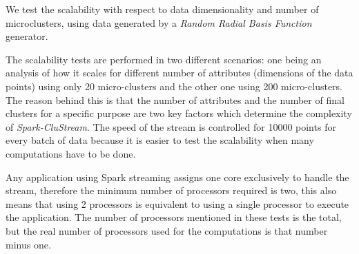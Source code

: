 We test the scalability with respect to data dimensionality and number of microclusters, using data generated by a \textit{Random Radial Basis Function} generator.

The scalability tests are performed in two different scenarios: one being an analysis of how it scales for different number of attributes (dimensions of the data points) using only 20 micro-clusters and the other one using 200 micro-clusters. The reason behind this is that the number of attributes and the number of final clusters for a specific purpose are two key factors which determine the complexity of \textit{Spark-CluStream}. The speed of the stream is controlled for 10000 points for every batch of data because it is easier to test the scalability when many computations have to be done.

Any application using Spark streaming assigns one core exclusively to handle the stream, therefore the minimum number of processors required is two, this also means that using 2 processors is equivalent to using a single processor to execute the application. The number of processors mentioned in these tests is the total, but the real number of processors used for the computations is that number minus one.


